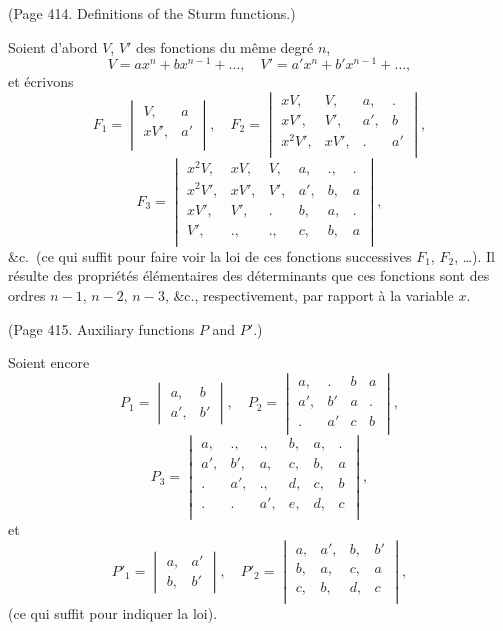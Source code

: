 \documentclass[11pt,a4paper]{article}
\theoremstyle{plain}
\theoremstyle{definition}
\begin{document}
(Page 414. Definitions of the Sturm functions.)

Soient d'abord $V$, $V'$ des fonctions du m\^{e}me degr\'{e} $n$,
\[
V = ax^n + bx^{n-1} + \ldots, \quad V' = a'x^n + b'x^{n-1} + \ldots,
\]
et \'{e}crivons
\[
F_1 =
\begin{vmatrix}
V, & a \\
xV', & a'\\
\end{vmatrix},
\quad
F_2 =
\begin{vmatrix}
xV, & V, & a, & . \\
xV', & V', & a', & b \\
x^2V', & xV', & . & a'\\
\end{vmatrix},
\]
\[
F_3 =
\begin{vmatrix}
x^2V, & xV, & V, & a, & ., & . \\
x^2V', & xV', & V', & a', & b, & a \\
xV', & V', & . & b, & a, & . \\
V', & ., & ., & c, & b, & a\\
\end{vmatrix},
\]
\&c.\ (ce qui suffit pour faire voir la loi de ces fonctions successives $F_1$, $F_2$, \ldots).
Il r\'{e}sulte des propri\'{e}t\'{e}s \'{e}l\'{e}mentaires des d\'{e}terminants que ces fonctions sont des ordres
$n-1$, $n-2$, $n-3$, \&c., respectivement, par rapport \`{a} la variable $x$.

(Page 415. Auxiliary functions $P$ and $P'$.)

Soient encore
\[
P_1 =
\begin{vmatrix}
a, & b \\
a', & b'
\end{vmatrix},
\quad
P_2 =
\begin{vmatrix}
a, & . & b & a \\
a', & b' & a & . \\
. & a' & c & b\\
\end{vmatrix},
\]
\[
P_3 =
\begin{vmatrix}
a, & ., & ., & b, & a, & . \\
a', & b', & a, & c, & b, & a \\
. & a', & ., & d, & c, & b \\
. & . & a', & e, & d, & c\\
\end{vmatrix},
\]
et
\[
P'_1 =
\begin{vmatrix}
a, & a'\\
b, & b'
\end{vmatrix},
\quad
P'_2 =
\begin{vmatrix}
a, & a', & b, & b' \\
b, & a, & c, & a \\
c, & b, & d, & c\\
\end{vmatrix},
\]
(ce qui suffit pour indiquer la loi).
\end{document}
